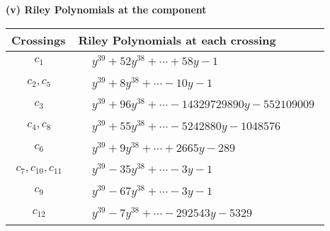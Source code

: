 \documentclass[1p]{elsarticle_modified}
\theoremstyle{definition}
\begin{document}
\newpage\renewcommand{\arraystretch}{1}
\flushleft \textbf{(v) Riley Polynomials at the component}\newline \\
\begin{tabular}{m{50pt}|m{274pt}}
Crossings & \hspace{64pt}Riley Polynomials at each crossing \\
\hline $$\begin{aligned}c_{1}\end{aligned}$$&$\begin{aligned}
&y^{39}+52 y^{38}+\cdots+58 y-1
\end{aligned}$\\
\hline $$\begin{aligned}c_{2},c_{5}\end{aligned}$$&$\begin{aligned}
&y^{39}+8 y^{38}+\cdots-10 y-1
\end{aligned}$\\
\hline $$\begin{aligned}c_{3}\end{aligned}$$&$\begin{aligned}
&y^{39}+96 y^{38}+\cdots-14329729890 y-552109009
\end{aligned}$\\
\hline $$\begin{aligned}c_{4},c_{8}\end{aligned}$$&$\begin{aligned}
&y^{39}+55 y^{38}+\cdots-5242880 y-1048576
\end{aligned}$\\
\hline $$\begin{aligned}c_{6}\end{aligned}$$&$\begin{aligned}
&y^{39}+9 y^{38}+\cdots+2665 y-289
\end{aligned}$\\
\hline $$\begin{aligned}c_{7},c_{10},c_{11}\end{aligned}$$&$\begin{aligned}
&y^{39}-35 y^{38}+\cdots-3 y-1
\end{aligned}$\\
\hline $$\begin{aligned}c_{9}\end{aligned}$$&$\begin{aligned}
&y^{39}-67 y^{38}+\cdots-3 y-1
\end{aligned}$\\
\hline $$\begin{aligned}c_{12}\end{aligned}$$&$\begin{aligned}
&y^{39}-7 y^{38}+\cdots-292543 y-5329
\end{aligned}$\\
\hline
\end{tabular}\\~\\
\end{document}
